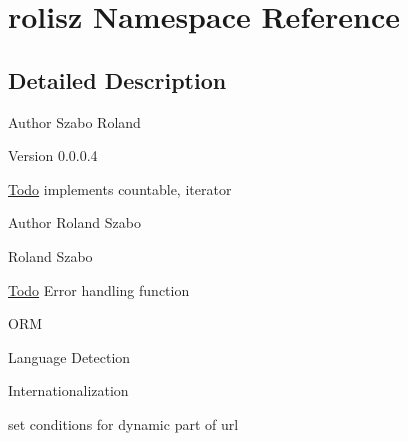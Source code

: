 \hypertarget{namespacerolisz}{
\section{rolisz Namespace Reference}
\label{namespacerolisz}
}


\subsection{Detailed Description}
\begin{DoxyAuthor}{Author}
Szabo Roland 
\end{DoxyAuthor}
\begin{DoxyVersion}{Version}
0.0.0.4 
\end{DoxyVersion}
\begin{Desc}
\item[\hyperlink{todo__todo000001}{Todo}]implements countable, iterator \end{Desc}


\begin{DoxyAuthor}{Author}
Roland Szabo

Roland Szabo 
\end{DoxyAuthor}
\begin{Desc}
\item[\hyperlink{todo__todo000008}{Todo}]Error handling function 

ORM 

Language Detection 

Internationalization 

set conditions for dynamic part of url \end{Desc}
